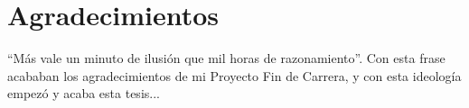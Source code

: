%
%
%
% 
%
%
%

\chapter*{Agradecimientos}
\label{cha:agradecimientos}




``Más vale un minuto de ilusión que mil horas de razonamiento''. Con
esta frase acababan los agradecimientos de mi Proyecto Fin de Carrera,
y con esta ideología empezó y acaba esta tesis...



